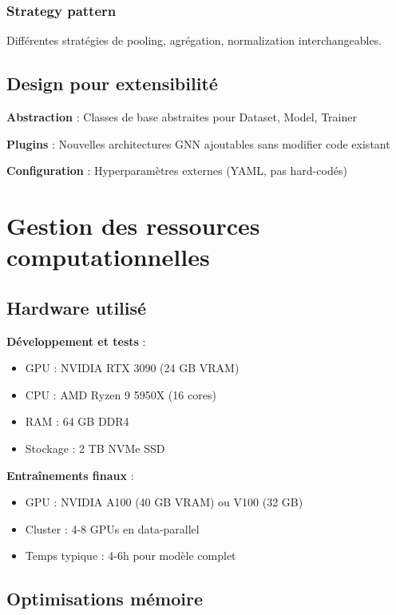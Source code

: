 \subsubsection{Strategy pattern}

Différentes stratégies de pooling, agrégation, normalization interchangeables.

\subsection{Design pour extensibilité}

\textbf{Abstraction} : Classes de base abstraites pour Dataset, Model, Trainer

\textbf{Plugins} : Nouvelles architectures GNN ajoutables sans modifier code existant

\textbf{Configuration} : Hyperparamètres externes (YAML, pas hard-codés)

\section{Gestion des ressources computationnelles}

\subsection{Hardware utilisé}

\textbf{Développement et tests} :
\begin{itemize}
    \item GPU : NVIDIA RTX 3090 (24 GB VRAM)
    \item CPU : AMD Ryzen 9 5950X (16 cores)
    \item RAM : 64 GB DDR4
    \item Stockage : 2 TB NVMe SSD
\end{itemize}

\textbf{Entraînements finaux} :
\begin{itemize}
    \item GPU : NVIDIA A100 (40 GB VRAM) ou V100 (32 GB)
    \item Cluster : 4-8 GPUs en data-parallel
    \item Temps typique : 4-6h pour modèle complet
\end{itemize}

\subsection{Optimisations mémoire}

